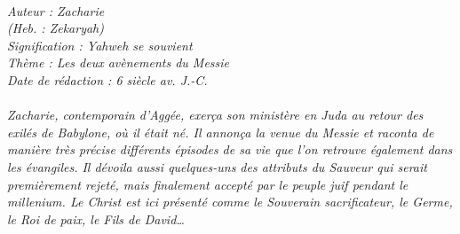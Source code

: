 \BFont
\noindent\hrulefill
{\footnotesize
\textit{
\bigskip
{\centering{}
\\Auteur : Zacharie
\\(Heb. : Zekaryah)
\\Signification : Yahweh se souvient
\\Thème : Les deux avènements du Messie
\\Date de rédaction : 6 siècle av. J.-C.\\}
}
\textit{
\\Zacharie, contemporain d'Aggée, exerça son ministère en Juda au retour des exilés de Babylone, où il était né. Il annonça la venue du Messie et raconta de manière très précise différents épisodes de sa vie que l'on retrouve également dans les évangiles. Il dévoila aussi quelques-uns des attributs du Sauveur qui serait premièrement rejeté, mais finalement accepté par le peuple juif pendant le millenium. Le Christ est ici présenté comme le Souverain sacrificateur, le Germe, le Roi de paix, le Fils de David…\bigskip
}
}
\par\nobreak\noindent\hrulefill
